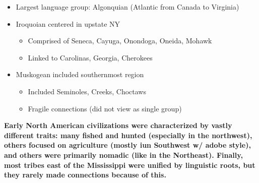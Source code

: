 \documentclass[a4paper]{article}
\begin{document}
{\begin{itemize}
\begin{itemize}
                \begin{itemize}
                    \item Largest language group: Algonquian (Atlantic from Canada to Virginia)
                    \item Iroquoian centered in upstate NY 
                    \begin{itemize}
                        \item Comprised of Seneca, Cayuga, Onondoga, Oneida, Mohawk
                        \item Linked to Carolinas, Georgia, Cherokees
                    \end{itemize}
                    \item Muskogean included southernmost region
                    \begin{itemize}
                        \item Included Seminoles, Creeks, Choctaws
                        \item Fragile connections (did not view as single group)
                    \end{itemize}
                \end{itemize}
            \end{itemize}
        \end{itemize}
        \textbf{Early North American civilizations were characterized by vastly different traits: many fished and hunted (especially in the northwest), others focused on agriculture (mostly iun Southwest w/ adobe style), and others were primarily nomadic (like in the Northeast). Finally, most tribes east of the Mississippi were unified by linguistic roots, but they rarely made connections because of this.}
    }
\end{document}
